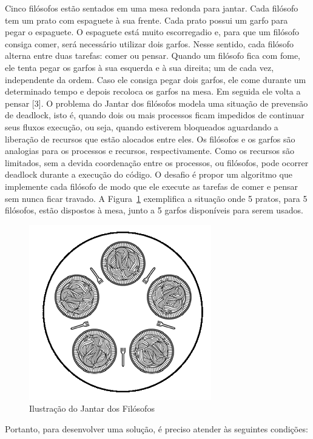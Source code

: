 \documentclass[
	12pt,				%
	openright,			%
	oneside,			%
	a4paper,			%
	chapter=TITLE,		%
	english,			%
	french,				%
	spanish,			%
	brazil				%
	]{abntex2}
\theoremstyle{definition}
\begin{document}
Cinco filósofos estão sentados em uma mesa redonda para jantar. Cada filósofo tem um prato com espaguete à sua frente. Cada prato possui um garfo para pegar o espaguete. O espaguete está muito escorregadio e, para que um filósofo consiga comer, será necessário utilizar dois garfos. Nesse sentido, cada filósofo alterna entre duas tarefas: comer ou pensar. Quando um filósofo fica com fome, ele tenta pegar os garfos à sua esquerda e à sua direita; um de cada vez, independente da ordem. Caso ele consiga pegar dois garfos, ele come durante um determinado tempo e depois recoloca os garfos na mesa. Em seguida ele volta a pensar [3]. O problema do Jantar dos filósofos modela uma situação de prevensão de deadlock, isto é, quando dois ou mais processos ficam impedidos de continuar seus fluxos execução, ou seja, quando estiverem bloqueados aguardando a liberação de recursos que estão alocados entre eles. Os filósofos e os garfos são analogias para os processos e recursos, respectivamente. Como os recursos são limitados, sem a devida coordenação entre os processos, ou filósofos, pode ocorrer deadlock durante a execução do código. O desafio é propor um algoritmo que implemente cada filósofo de modo que ele execute as tarefas de comer e pensar sem nunca ficar travado. A Figura~\ref{fig:jantar_exemplo} exemplifica a situação onde 5 pratos, para 5 filósofos, estão dispostos à mesa, junto a 5 garfos disponíveis para serem usados.

\begin{figure}
    \centering
    \includegraphics{imagens/jantar.png}
    \caption{Ilustração do Jantar dos Filósofos}
    \label{fig:jantar_exemplo}
\end{figure}

Portanto, para desenvolver uma solução, é preciso atender às seguintes condições:
\end{document}

